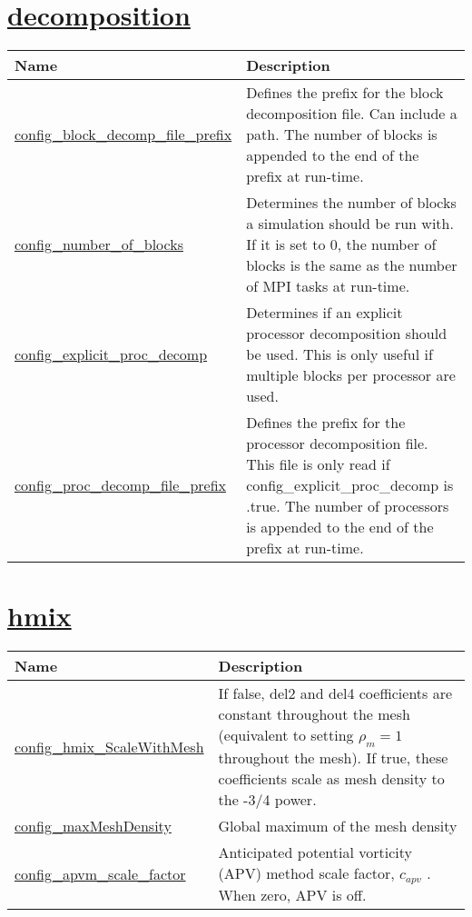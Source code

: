 \section[decomposition]{\hyperref[sec:nm_sec_decomposition]{decomposition}}
\label{sec:nm_tab_decomposition}

{\small
\begin{center}
\begin{longtable}{| p{2.0in} || p{4.0in} |}
	\hline
	{\bf Name} & {\bf Description} \\
	\hline
	\hline
	\hyperref[subsec:nm_sec_config_block_decomp_file_prefix]{config\_block\_decomp\_file\_prefix} & Defines the prefix for the block decomposition file. Can include a path. The number of blocks is appended to the end of the prefix at run-time. \\
	\hline
	\hyperref[subsec:nm_sec_config_number_of_blocks]{config\_number\_of\_blocks} & Determines the number of blocks a simulation should be run with. If it is set to 0, the number of blocks is the same as the number of MPI tasks at run-time. \\
	\hline
	\hyperref[subsec:nm_sec_config_explicit_proc_decomp]{config\_explicit\_proc\_decomp} & Determines if an explicit processor decomposition should be used. This is only useful if multiple blocks per processor are used. \\
	\hline
	\hyperref[subsec:nm_sec_config_proc_decomp_file_prefix]{config\_proc\_decomp\_file\_prefix} & Defines the prefix for the processor decomposition file. This file is only read if config\_explicit\_proc\_decomp is .true. The number of processors is appended to the end of the prefix at run-time. \\
	\hline
\end{longtable}
\end{center}
}
\section[hmix]{\hyperref[sec:nm_sec_hmix]{hmix}}
\label{sec:nm_tab_hmix}

{\small
\begin{center}
\begin{longtable}{| p{2.0in} || p{4.0in} |}
	\hline
	{\bf Name} & {\bf Description} \\
	\hline
	\hline
	\hyperref[subsec:nm_sec_config_hmix_ScaleWithMesh]{config\_hmix\_ScaleWithMesh} &  If false, del2 and del4 coefficients are constant throughout the mesh (equivalent to setting  $\rho_m=1$  throughout the mesh).  If true, these coefficients scale as mesh density to the -3/4 power. \\
	\hline
	\hyperref[subsec:nm_sec_config_maxMeshDensity]{config\_maxMeshDensity} & Global maximum of the mesh density \\
	\hline
	\hyperref[subsec:nm_sec_config_apvm_scale_factor]{config\_apvm\_scale\_factor} &  Anticipated potential vorticity (APV) method scale factor,  $c_{apv}$ .  When zero, APV is off. \\
	\hline
\end{longtable}
\end{center}
}
